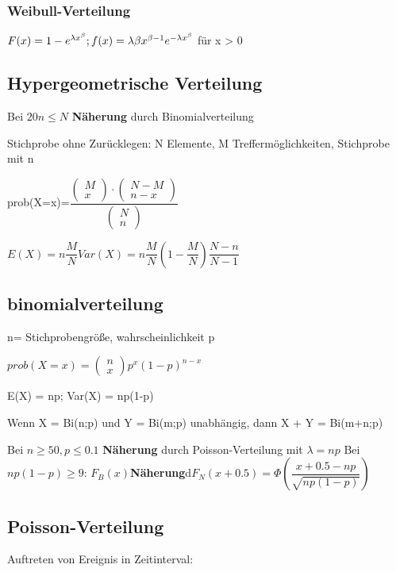 \subsubsection*{Weibull-Verteilung}
$F(x) = 1 - e^{\lambda x^\beta};  \\f(x) = \lambda \beta x^{\beta -1} e^{-\lambda x^\beta}$ für x > 0 


\subsection*{Hypergeometrische Verteilung}
Bei $ 20 n \leq N $ \textbf{Näherung} durch Binomialverteilung

Stichprobe ohne Zurücklegen: N Elemente, M Treffermöglichkeiten, Stichprobe mit n

prob(X=x)=$ \dfrac{\left( \! \begin{array}{c}M \\ x \end{array} \! \right) \cdot \left( \begin{array}{c}N-M \\ n-x \end{array}  \right) }{\left( \begin{array}{c}N \\ n \end{array}  \right) }$

$E(X)=n\dfrac{M}{N}
Var(X) = n\dfrac{M}{N} \left( 1- \dfrac{M}{N} \right) \dfrac{N-n}{N-1}
$

\subsection*{binomialverteilung}
n= Stichprobengröße, wahrscheinlichkeit p 

$prob(X=x) = \left( \begin{array}{c} n \\ x \end{array} \right) p^x (1-p)^{n-x}$

E(X) = np; Var(X) = np(1-p)

Wenn X = Bi(n;p) und Y = Bi(m;p) unabhängig, dann X + Y = Bi(m+n;p)

Bei $n \geq 50, p \leq 0.1 $ \textbf{Näherung} durch Poisson-Verteilung mit $\lambda = np$
Bei $np(1-p)\geq 9$: $F_B(x) $\textbf{Näherung}d$ F_N(x+0.5) = \Phi \left( \dfrac{x+0.5 -np}{\sqrt{np(1-p)}}\right)$


\subsection*{Poisson-Verteilung}
Auftreten von Ereignis in Zeitinterval:

